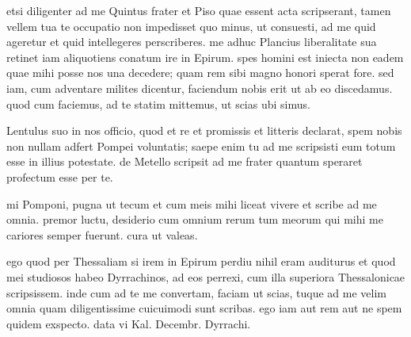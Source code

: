 


 etsi diligenter ad me Quintus frater et Piso quae essent acta scripserant, tamen vellem tua te occupatio non impedisset quo minus, ut consuesti, ad me quid ageretur et quid intellegeres perscriberes. me adhuc Plancius liberalitate sua retinet iam aliquotiens conatum ire in Epirum. spes homini est iniecta non eadem quae mihi posse nos una decedere; quam rem sibi magno honori sperat fore. sed iam, cum adventare milites dicentur, faciendum nobis erit ut ab eo discedamus. quod cum faciemus, ad te statim mittemus, ut scias ubi simus.

 Lentulus suo in nos officio, quod et re et promissis et litteris declarat, spem nobis non nullam adfert Pompei voluntatis; saepe enim tu ad me scripsisti eum totum esse in illius potestate. de Metello scripsit ad me frater quantum speraret profectum esse per te.

 mi Pomponi, pugna ut tecum et cum meis mihi liceat vivere et scribe ad me omnia. premor luctu, desiderio cum omnium rerum tum meorum qui mihi me cariores semper fuerunt. cura ut valeas.

 ego quod per Thessaliam si irem in Epirum perdiu nihil eram auditurus et quod mei studiosos habeo Dyrrachinos, ad eos perrexi, cum illa superiora Thessalonicae scripsissem. inde cum ad te me convertam, faciam ut scias, tuque ad me velim omnia quam diligentissime cuicuimodi sunt scribas. ego iam aut rem aut ne spem quidem exspecto. data vi Kal. Decembr. Dyrrachi.
